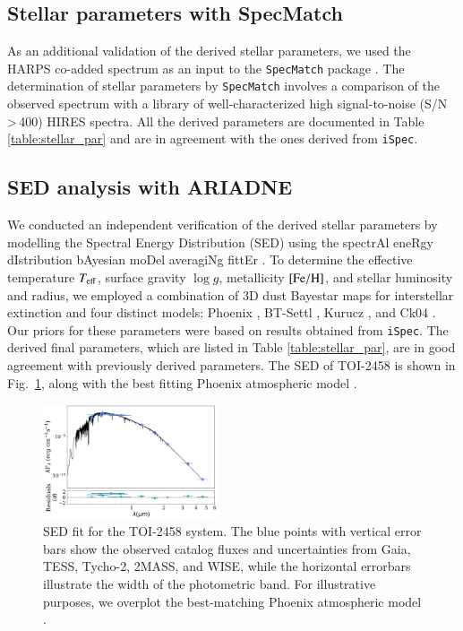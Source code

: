 \documentclass[traditabstract,longauth]{aa}
\begin{document}
\subsection{Stellar parameters with SpecMatch}\label{sec:SpecMatch}

As an additional validation of the derived stellar parameters, we used the HARPS co-added spectrum as an input to the {\tt SpecMatch} package \citep{Yee17}. The determination of stellar parameters by {\tt SpecMatch} involves a comparison of the observed spectrum with a library of well-characterized high signal-to-noise (S/N\,>\,400) HIRES spectra. All the derived parameters are documented in Table \ref{table:stellar_par} and are in agreement with the ones derived from {\tt iSpec}.

\subsection{SED analysis with ARIADNE}\label{sec:ARIADNE}

We conducted an independent verification of the derived stellar parameters by modelling the Spectral Energy Distribution (SED) using the spectrAl eneRgy dIstribution bAyesian moDel averagiNg fittEr \citep[{\tt ARIADNE};][]{Vines22}. To determine the effective temperature $T_{\rm eff}$, surface gravity $\log{g}$, metallicity $\rm [Fe/H]$, and stellar luminosity and radius, we employed a combination of 3D dust Bayestar maps for interstellar extinction \citep{Green19} and four distinct models: Phoenix \citep{Husser2013}, BT-Settl \citep{Allard2012}, Kurucz \citep{Kurucz93}, and Ck04 \citep{Castelli2004}. Our priors for these parameters were based on results obtained from {\tt iSpec}. The derived final parameters, which are listed in Table \ref{table:stellar_par}, are in good agreement with previously derived parameters. The SED of TOI-2458 is shown in Fig.~\ref{fig:SED}, along with the best fitting Phoenix atmospheric model \citep{Husser2013}.

\begin{figure}
\centering
\includegraphics[width=0.46\textwidth, trim= {0.0cm 0.0cm 0.0cm 0.0cm}]{figures/SED.png}
\caption{SED fit for the TOI-2458 system. The blue points with vertical error bars show the observed catalog fluxes and uncertainties from Gaia, TESS, Tycho-2, 2MASS, and WISE, while the horizontal errorbars illustrate the width of the photometric band. For illustrative purposes, we overplot the best-matching Phoenix atmospheric model \citep{Husser2013}.} \label{fig:SED}
\end{figure}
\end{document}
